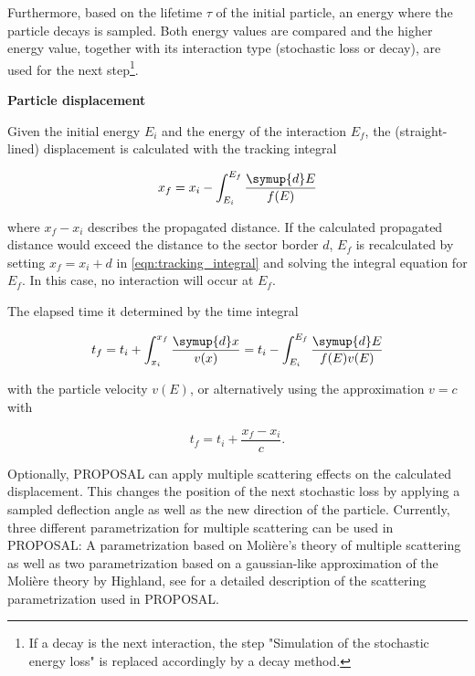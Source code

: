 Furthermore, based on the lifetime $\tau$ of the initial particle, an energy where the particle decays is sampled.
Both energy values are compared and the higher energy value, together with its interaction type (stochastic loss or decay), are used for the next step\footnote{If a decay is the next interaction, the step "Simulation of the stochastic energy loss" is replaced accordingly by a decay method.}.

\textbf{Particle displacement}

Given the initial energy $E_i$ and the energy of the interaction $E_f$, the (straight-lined) displacement is calculated with the tracking integral

\begin{equation}
	\label{eqn:tracking_integral}
	x_f = x_i - \int_{E_i}^{E_f} \frac{\symup{d}E}{f(E)}
\end{equation}

where $x_f - x_i$ describes the propagated distance.
If the calculated propagated distance would exceed the distance to the sector border $d$, $E_f$ is recalculated by setting $x_f = x_i + d$ in \eqref{eqn:tracking_integral} and solving the integral equation for $E_f$.
In this case, no interaction will occur at $E_f$.

The elapsed time it determined by the time integral 

\begin{equation}
	t_f = t_i + \int_{x_i}^{x_f} \frac{\symup{d}x}{v(x)} = t_i - \int_{E_i}^{E_f} \frac{\symup{d}E}{f(E)v(E)}
\end{equation}

with the particle velocity $v(E)$, or alternatively using the approximation $v=c$ with 

\begin{equation}
	t_f = t_i + \frac{x_f - x_i}{c}.
\end{equation}

Optionally, PROPOSAL can apply multiple scattering effects on the calculated displacement.
This changes the position of the next stochastic loss by applying a sampled deflection angle as well as the new direction of the particle.
Currently, three different parametrization for multiple scattering can be used in PROPOSAL:
A parametrization based on Molière's theory of multiple scattering as well as two parametrization based on a gaussian-like approximation of the Molière theory by Highland, see \cite{GeiselBrinck2013RevisionOT} for a detailed description of the scattering parametrization used in PROPOSAL. 

